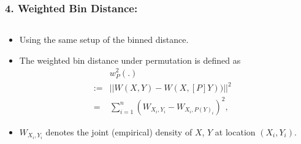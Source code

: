 \documentclass{beamer}
\begin{document}
\begin{frame}
\frametitle{4. Weighted Bin Distance:}
	\begin{columns}
		\begin{column}{0.52\textwidth}
		\begin{itemize}
\item Using the same setup of the binned distance.
\item The weighted bin distance under permutation is defined as 
\begin{eqnarray*}
& & w_P^2(.)\\ &:=&||W(X,Y) - W(X,[P]Y))||^2 \\ &=& \sum_{i=1}^n (W_{X_{i},Y_i} - W_{X_i,P(Y)_i})^2 , 
\end{eqnarray*}
\item $W_{X_i,Y_i}$ denotes the joint (empirical) density of $X$, $Y$ at location $(X_i, Y_i)$. 
\end{itemize}	
			
		\end{column}
		
		\begin{column}{0.5\textwidth}
			 \begin{center}  \end{center}
		\end{column}
	\end{columns}  
\end{frame}
\end{document}
